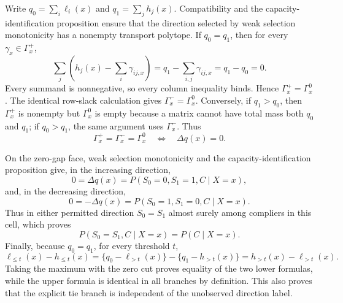Write \(q_0=\sum_i\ell_i(x)\) and \(q_1=\sum_jh_j(x)\).  Compatibility and the capacity-identification proposition ensure that the direction selected by weak selection monotonicity has a nonempty transport polytope.  If \(q_0=q_1\), then for every \(\gamma_x\in\Gamma_x^+\),
\[
\sum_j\left(h_j(x)-\sum_i\gamma_{ij,x}\right)
=q_1-\sum_{i,j}\gamma_{ij,x}=q_1-q_0=0.
\]
Every summand is nonnegative, so every column inequality binds.  Hence \(\Gamma_x^+=\Gamma_x^0\).  The identical row-slack calculation gives \(\Gamma_x^-=\Gamma_x^0\).  Conversely, if \(q_1>q_0\), then \(\Gamma_x^+\) is nonempty but \(\Gamma_x^0\) is empty because a matrix cannot have total mass both \(q_0\) and \(q_1\); if \(q_0>q_1\), the same argument uses \(\Gamma_x^-\).  Thus
\[
\Gamma_x^+=\Gamma_x^-=\Gamma_x^0\quad\Longleftrightarrow\quad \Delta q(x)=0.
\]

On the zero-gap face, weak selection monotonicity and the capacity-identification proposition give, in the increasing direction,
\[
0=\Delta q(x)=P(S_0=0,S_1=1,C\mid X=x),
\]
and, in the decreasing direction,
\[
0=-\Delta q(x)=P(S_0=1,S_1=0,C\mid X=x).
\]
Thus in either permitted direction \(S_0=S_1\) almost surely among compliers in this cell, which proves
\[
P(S_0=S_1,C\mid X=x)=P(C\mid X=x).
\]
Finally, because \(q_0=q_1\), for every threshold \(t\),
\[
\ell_{\le t}(x)-h_{\le t}(x)
=\{q_0-\ell_{>t}(x)\}-\{q_1-h_{>t}(x)\}
=h_{>t}(x)-\ell_{>t}(x).
\]
Taking the maximum with the zero cut proves equality of the two lower formulas, while the upper formula is identical in all branches by definition.  This also proves that the explicit tie branch is independent of the unobserved direction label.